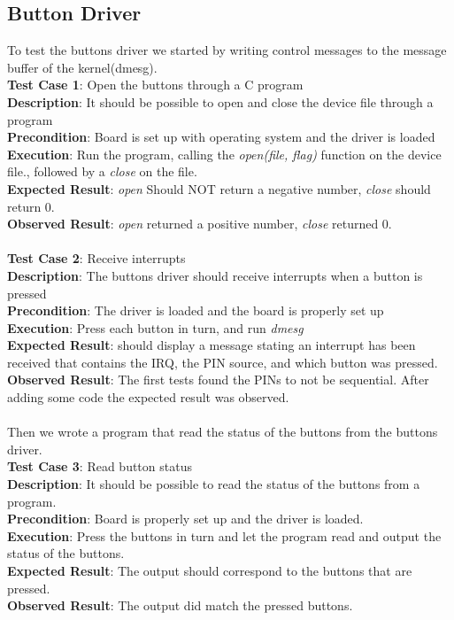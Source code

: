 \subsection{Button Driver}
To test the buttons driver we started by writing control messages to the message buffer of the kernel(dmesg).
\\
{\bf Test Case 1}: Open the buttons through a C program \\
{\bf Description}: It should be possible to open and close the device file through a program \\
{\bf Precondition}: Board is set up with operating system and the driver is loaded\\
{\bf Execution}: Run the program, calling the {\it open(file, flag)} function on the device
file., followed by a {\it close} on the file.\\
{\bf Expected Result}: {\it open} Should NOT return a negative number, {\it close}
should return 0.\\
{\bf Observed Result}: {\it open} returned a positive number, {\it close}
returned 0. \\
 \\
{\bf Test Case 2}: Receive interrupts \\
{\bf Description}: The buttons driver should receive interrupts when a button is pressed \\
{\bf Precondition}: The driver is loaded and the board is properly set up\\
{\bf Execution}: Press each button in turn, and run {\it dmesg}\\
{\bf Expected Result}: should display a message stating an interrupt has been received that contains the IRQ, the PIN source, and which button was pressed.\\
{\bf Observed Result}: The first tests found the PINs to not be sequential.  After adding some code the expected result was observed.\\
\\
Then we wrote a program that read the status of the buttons from the buttons driver.
\\
{\bf Test Case 3}: Read button status \\
{\bf Description}: It should be possible to read the status of the buttons from a program. \\
{\bf Precondition}: Board is properly set up and the driver is loaded. \\
{\bf Execution}: Press the buttons in turn and let the program read and output the status of the buttons.\\
{\bf Expected Result}: The output should correspond to the buttons that are pressed.\\
{\bf Observed Result}:	The output did match the pressed buttons.\\
 \\
